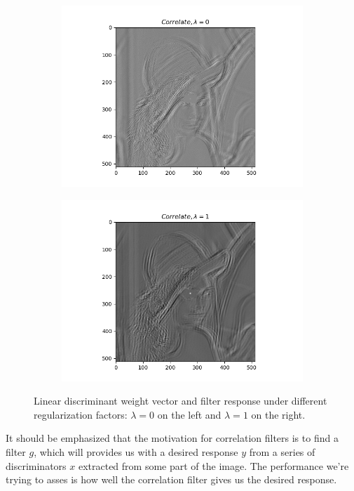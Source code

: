 \documentclass{article} %
\begin{document}
\begin{figure}[H]
\begin{subfigure}[b]{0.49\textwidth}
            \includegraphics[width=\textwidth]{q43_img0.png}
        \end{subfigure}
        \begin{subfigure}[b]{0.49\textwidth}
            \centering
            \includegraphics[width=\textwidth]{q43_img1.png}
        \end{subfigure}
        \caption{Linear discriminant weight vector and filter response under different regularization factors: $\lambda=0$ on the left and $\lambda=1$ on the right.}
    \end{figure}

    It should be emphasized that the motivation for correlation filters is to find a filter $g$, which will provides us with a desired response $y$ from a series of discriminators $x$ extracted from some part of the image. The performance we're trying to asses is how well the correlation filter gives us the desired response.
    \medskip
\end{document}
